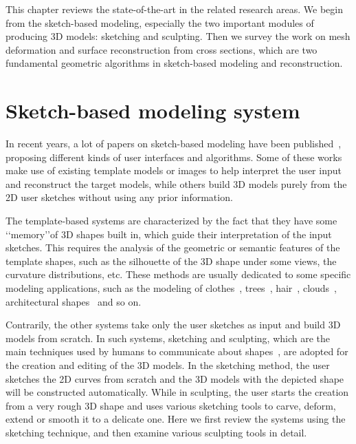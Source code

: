 This chapter reviews the state-of-the-art in the related research
areas.  We begin from the sketch-based modeling, especially the two
important modules of producing 3D models: sketching and sculpting.
Then we survey the work on mesh deformation and surface
reconstruction from cross sections, which are two fundamental
geometric algorithms in sketch-based modeling and reconstruction.



\section{Sketch-based modeling system}\label{ch2:sec:sbim}

In recent years, a lot of papers on sketch-based  modeling have been
published~\cite{OSSJ09}, proposing different kinds of user
interfaces and algorithms. Some of these works make use of existing
template models or images to help interpret the user input and
reconstruct the target models, while others build 3D models purely
from the 2D user sketches without using any prior information.

The template-based systems are characterized by  the fact that they
have some \lq\lq{memory}\rq\rq of 3D shapes built in, which guide
their interpretation of the input sketches. This requires the
analysis of the geometric or semantic features of the template
shapes, such as the silhouette of the 3D shape under some views, the
curvature distributions, etc. These methods are usually dedicated to
some specific modeling applications, such as the modeling of
clothes~\cite{TWBCH07}, trees~\cite{TST06,OOI06,CNXDK08},
hair~\cite{WBC07}, clouds~\cite{WBC08}, architectural
shapes~\cite{SketchUp} and so on.

Contrarily, the other systems take only the user  sketches as input
and build 3D models from scratch. In such systems, sketching and
sculpting, which are the main techniques used by humans to
communicate about shapes~\cite{CIW08}, are adopted for the creation
and editing of the 3D models. In the sketching method, the user
sketches the 2D curves from scratch and the 3D models with the
depicted shape will be constructed automatically. While in
sculpting, the user starts the creation from a very rough 3D shape
and uses various sketching tools to carve, deform, extend or smooth
it to a delicate one. Here we first review the systems using the
sketching technique, and then examine various sculpting tools in
detail.


